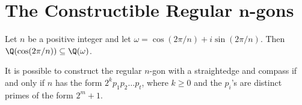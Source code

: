 \section{The Constructible Regular $\mathbf{n}$-gons}

\begin{lemma}
	Let $n$ be a positive integer and let $\omega = \cos(2\pi/n)+i\sin(2\pi/n)$. Then $\Q(\cos(2\pi/n)) \subseteq \Q(\omega)$.
\end{lemma}

\begin{theorem}[(Gauss, 1796)]
	It is possible to construct the regular $n$-gon with a straightedge and compass if and only if $n$ has the form $2^kp_1p_2\dots p_t$, where $k \geq 0$ and the $p_i$'s are distinct primes of the form $2^m + 1$.
\end{theorem}
